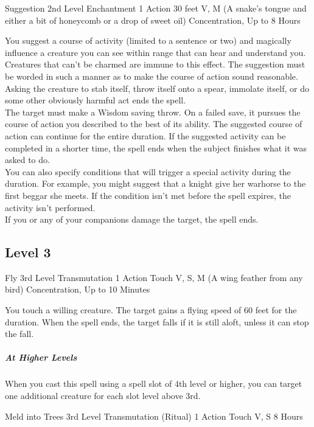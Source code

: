 \documentclass[letterpaper,openany,oneside,twocolumn]{book}
\begin{document}
\DndSpellHeader
  {Suggestion}
  {2nd Level Enchantment}
  {1 Action}
  {30 feet}
  {V, M (A snake's tongue and either a bit of honeycomb or a drop of sweet oil)}
  {Concentration, Up to 8 Hours}

You suggest a course of activity (limited to a sentence or two) and magically influence a creature you can see within range that can hear and understand you. Creatures that can't be charmed are immune to this effect. The suggestion must be worded in such a manner as to make the course of action sound reasonable. Asking the creature to stab itself, throw itself onto a spear, immolate itself, or do some other obviously harmful act ends the spell.\\
The target must make a Wisdom saving throw. On a failed save, it pursues the course of action you described to the best of its ability. The suggested course of action can continue for the entire duration. If the suggested activity can be completed in a shorter time, the spell ends when the subject finishes what it was asked to do.\\
You can also specify conditions that will trigger a special activity during the duration. For example, you might suggest that a knight give her warhorse to the first beggar she meets. If the condition isn't met before the spell expires, the activity isn't performed.\\
If you or any of your companions damage the target, the spell ends.

\subsection*{Level 3}

\DndSpellHeader
  {Fly}
  {3rd Level Transmutation}
  {1 Action}
  {Touch}
  {V, S, M (A wing feather from any bird)}
  {Concentration, Up to 10 Minutes}
  
You touch a willing creature. The target gains a flying speed of 60 feet for the duration. When the spell ends, the target falls if it is still aloft, unless it can stop the fall.

\subparagraph*{At Higher Levels} When you cast this spell using a spell slot of 4th level or higher, you can target one additional creature for each slot level above 3rd.

\DndSpellHeader
  {Meld into Trees}
  {3rd Level Transmutation (Ritual)}
  {1 Action}
  {Touch}
  {V, S}
  {8 Hours}
  
\end{document}
